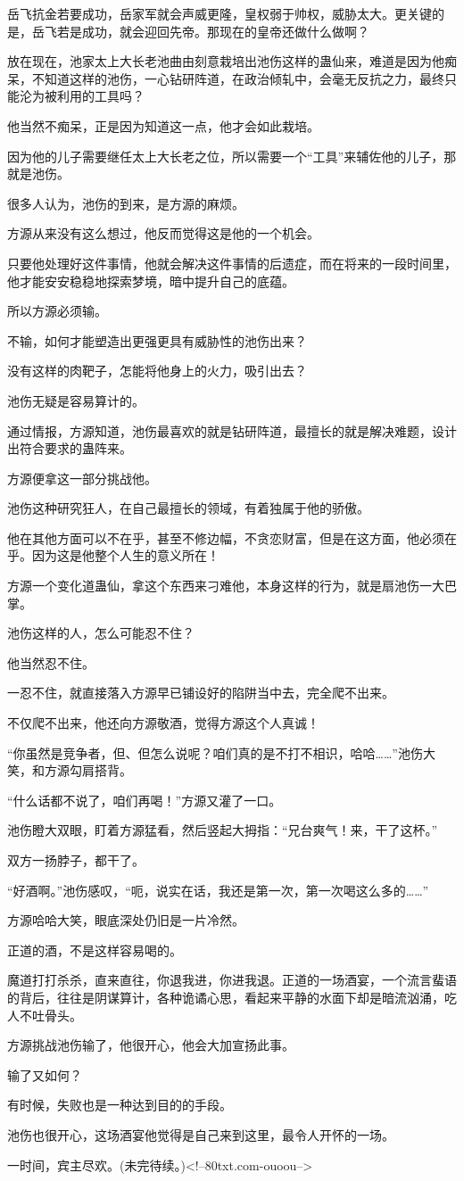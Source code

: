 \begin{this_body}
岳飞抗金若要成功，岳家军就会声威更隆，皇权弱于帅权，威胁太大。更关键的是，岳飞若是成功，就会迎回先帝。那现在的皇帝还做什么做啊？

放在现在，池家太上大长老池曲由刻意栽培出池伤这样的蛊仙来，难道是因为他痴呆，不知道这样的池伤，一心钻研阵道，在政治倾轧中，会毫无反抗之力，最终只能沦为被利用的工具吗？

他当然不痴呆，正是因为知道这一点，他才会如此栽培。

因为他的儿子需要继任太上大长老之位，所以需要一个“工具”来辅佐他的儿子，那就是池伤。

很多人认为，池伤的到来，是方源的麻烦。

方源从来没有这么想过，他反而觉得这是他的一个机会。

只要他处理好这件事情，他就会解决这件事情的后遗症，而在将来的一段时间里，他才能安安稳稳地探索梦境，暗中提升自己的底蕴。

所以方源必须输。

不输，如何才能塑造出更强更具有威胁性的池伤出来？

没有这样的肉靶子，怎能将他身上的火力，吸引出去？

池伤无疑是容易算计的。

通过情报，方源知道，池伤最喜欢的就是钻研阵道，最擅长的就是解决难题，设计出符合要求的蛊阵来。

方源便拿这一部分挑战他。

池伤这种研究狂人，在自己最擅长的领域，有着独属于他的骄傲。

他在其他方面可以不在乎，甚至不修边幅，不贪恋财富，但是在这方面，他必须在乎。因为这是他整个人生的意义所在！

方源一个变化道蛊仙，拿这个东西来刁难他，本身这样的行为，就是扇池伤一大巴掌。

池伤这样的人，怎么可能忍不住？

他当然忍不住。

一忍不住，就直接落入方源早已铺设好的陷阱当中去，完全爬不出来。

不仅爬不出来，他还向方源敬酒，觉得方源这个人真诚！

“你虽然是竞争者，但、但怎么说呢？咱们真的是不打不相识，哈哈……”池伤大笑，和方源勾肩搭背。

“什么话都不说了，咱们再喝！”方源又灌了一口。

池伤瞪大双眼，盯着方源猛看，然后竖起大拇指：“兄台爽气！来，干了这杯。”

双方一扬脖子，都干了。

“好酒啊。”池伤感叹，“呃，说实在话，我还是第一次，第一次喝这么多的……”

方源哈哈大笑，眼底深处仍旧是一片冷然。

正道的酒，不是这样容易喝的。

魔道打打杀杀，直来直往，你退我进，你进我退。正道的一场酒宴，一个流言蜚语的背后，往往是阴谋算计，各种诡谲心思，看起来平静的水面下却是暗流汹涌，吃人不吐骨头。

方源挑战池伤输了，他很开心，他会大加宣扬此事。

输了又如何？

有时候，失败也是一种达到目的的手段。

池伤也很开心，这场酒宴他觉得是自己来到这里，最令人开怀的一场。

一时间，宾主尽欢。(未完待续。)<!--80txt.com-ouoou-->

\end{this_body}

